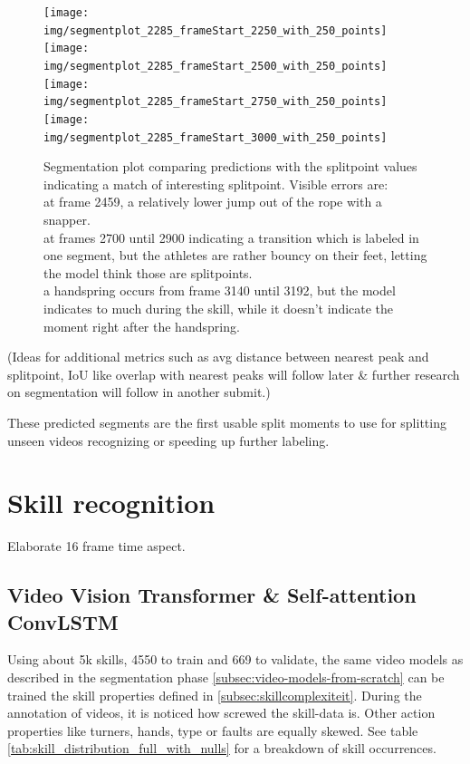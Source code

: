 \begin{figure}
    \centering
    \texttt{[image: img/segmentplot\_2285\_frameStart\_2250\_with\_250\_points]}
    \texttt{[image: img/segmentplot\_2285\_frameStart\_2500\_with\_250\_points]}    \texttt{[image: img/segmentplot\_2285\_frameStart\_2750\_with\_250\_points]}    \texttt{[image: img/segmentplot\_2285\_frameStart\_3000\_with\_250\_points]}
    \caption[Segmentation plot]{Segmentation plot comparing predictions with the splitpoint values indicating a match of interesting splitpoint. Visible errors are: \\
        at frame 2459, a relatively lower jump out of the rope with a snapper. \\
        at frames 2700 until 2900 indicating a transition which is labeled in one segment, but the athletes are rather bouncy on their feet, letting the model think those are splitpoints. \\
        a handspring occurs from frame 3140 until 3192, but the model indicates to much during the skill, while it doesn't indicate the moment right after the handspring.
    }
    \label{fig:segmentation-plot}
\end{figure}

(Ideas for additional metrics such as avg distance between nearest peak and splitpoint, IoU like overlap with nearest peaks will follow later \& further research on segmentation will follow in another submit.)

These predicted segments are the first usable split moments to use for splitting unseen videos recognizing or speeding up further labeling.

\section{Skill recognition}
\label{results:recognition}

Elaborate 16 frame time aspect.

\subsection{Video Vision Transformer \& Self-attention ConvLSTM}

Using about 5k skills, 4550 to train and 669 to validate, the same video models as described in the segmentation phase \ref{subsec:video-models-from-scratch} can be trained the skill properties defined in \ref{subsec:skillcomplexiteit}.
During the annotation of videos, it is noticed how screwed the skill-data is. Other action properties like turners, hands, type or faults are equally skewed. See table \ref{tab:skill_distribution_full_with_nulls} for a breakdown of skill occurrences.

